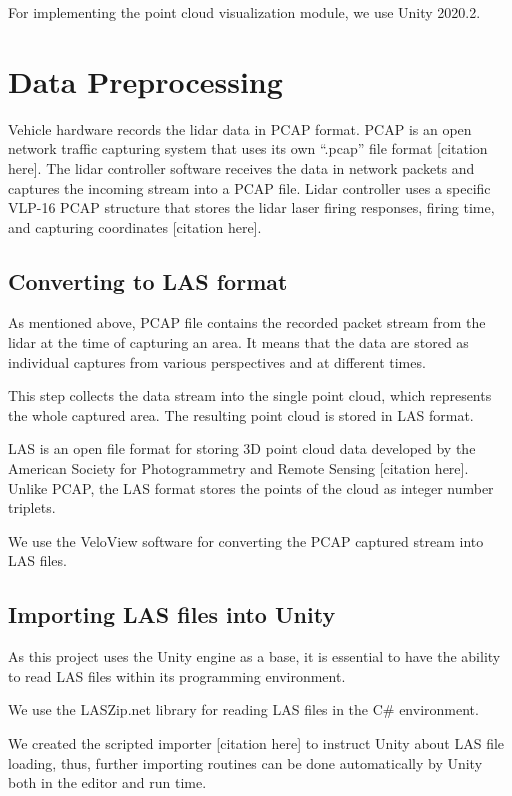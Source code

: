 For implementing the point cloud visualization module, we use Unity 2020.2.


\section{Data Preprocessing}

Vehicle hardware records the lidar data in PCAP format. PCAP is an open network traffic capturing system that uses its own “.pcap” file format [citation here]. The lidar controller software receives the data in network packets and captures the incoming stream into a PCAP file. Lidar controller uses a specific VLP-16 PCAP structure that stores the lidar laser firing responses, firing time, and capturing coordinates [citation here].

\subsection{Converting to LAS format}

As mentioned above, PCAP file contains the recorded packet stream from the lidar at the time of capturing an area. It means that the data are stored as individual captures from various perspectives and at different times.

This step collects the data stream into the single point cloud, which represents the whole captured area. The resulting point cloud is stored in LAS format.

LAS is an open file format for storing 3D point cloud data developed by the American Society for Photogrammetry and Remote Sensing [citation here]. Unlike PCAP, the LAS format stores the points of the cloud as integer number triplets.

We use the VeloView software for converting the PCAP captured stream into LAS files.

\subsection{Importing LAS files into Unity}

As this project uses the Unity engine as a base, it is essential to have the ability to read LAS files within its programming environment. 

We use the LASZip.net library for reading LAS files in the C\# environment.

We created the scripted importer [citation here] to instruct Unity about LAS file loading, thus, further importing routines can be done automatically by Unity both in the editor and run time.


